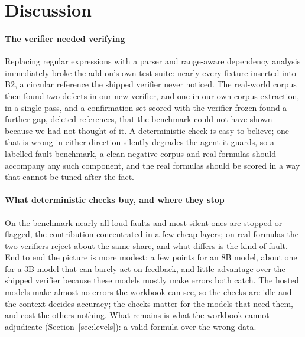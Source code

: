 \section{Discussion}
\label{sec:discussion}

\paragraph{The verifier needed verifying}
Replacing regular expressions with a parser and range-aware dependency analysis immediately broke the add-on's own test suite: nearly every fixture inserted  into B2, a circular reference the shipped verifier never noticed. The real-world corpus then found two defects in our new verifier, and one in our own corpus extraction, in a single pass, and a confirmation set scored with the verifier frozen found a further gap, deleted references, that the benchmark could not have shown because we had not thought of it. A deterministic check is easy to believe; one that is wrong in either direction silently degrades the agent it guards, so a labelled fault benchmark, a clean-negative corpus and real formulas should accompany any such component, and the real formulas should be scored in a way that cannot be tuned after the fact.

\paragraph{What deterministic checks buy, and where they stop}
On the benchmark nearly all loud faults and most silent ones are stopped or flagged, the contribution concentrated in a few cheap layers; on real formulas the two verifiers reject about the same share, and what differs is the kind of fault. End to end the picture is more modest: a few points for an 8B model, about one for a 3B model that can barely act on feedback, and little advantage over the shipped verifier because these models mostly make errors both catch. The hosted models make almost no errors the workbook can see, so the checks are idle and the context decides accuracy; the checks matter for the models that need them, and cost the others nothing. What remains is what the workbook cannot adjudicate (Section~\ref{sec:levels}): a valid formula over the wrong data.

